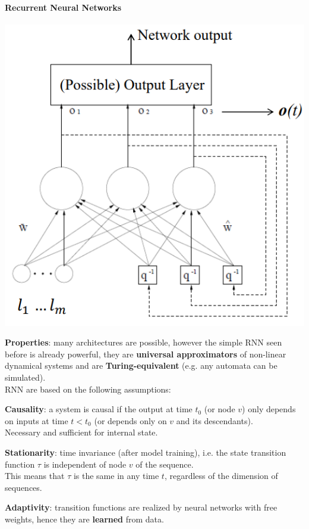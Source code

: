 \documentclass[10pt]{report}
\begin{document}
\paragraph{Recurrent Neural Networks} \begin{center}
	\includegraphics[scale=0.5]{37.png}
\end{center}
\textbf{Properties}: many architectures are possible, however the simple RNN seen before is already powerful, they are \textbf{universal approximators} of non-linear dynamical systems and are \textbf{Turing-equivalent} (e.g. any automata can be simulated).\\
RNN are based on the following assumptions:
\begin{list}{}{}
	\item \textbf{Causality}: a system is causal if the output at time $t_0$ (or node $v$) only depends on inputs at time $t<t_0$ (or depends only on $v$ and its descendants).\\
	Necessary and sufficient for internal state.
	\item \textbf{Stationarity}: time invariance (after model training), i.e. the state transition function $\tau$ is independent of node $v$ of the sequence.\\
	This means that $\tau$ is the same in any time $t$, regardless of the dimension of sequences.
	\item \textbf{Adaptivity}: transition functions are realized by neural networks with free weights, hence they are \textbf{learned} from data.
\end{list}
\end{document}

